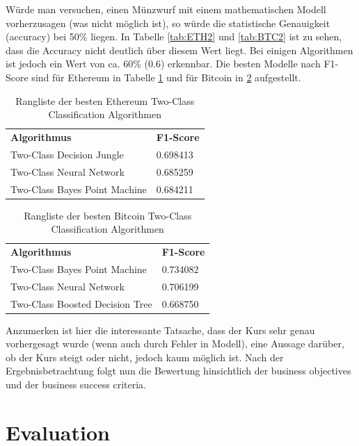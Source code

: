 Würde man versuchen, einen Münzwurf mit einem mathematischen Modell vorherzusagen (was nicht möglich ist), so würde die statistische Genauigkeit (accuracy) bei 50\% liegen. In Tabelle \ref{tab:ETH2} und \ref{tab:BTC2} ist zu sehen, dass die Accuracy nicht deutlich über diesem Wert liegt. Bei einigen Algorithmen ist jedoch ein Wert von ca. 60\% (0.6) erkennbar.
Die besten Modelle nach F1-Score sind für Ethereum in Tabelle \ref{tab:ETHBest} und für Bitcoin in \ref{tab:BTCBest} aufgestellt.
\begin{table}[H]
\centering
\begin{tabular}{|p{4cm}|p{4cm}|}
\hline
\textbf{Algorithmus} & \textbf{F1-Score}\\ 
\hhline{==}
Two-Class Decision Jungle & 0.698413 \\ \hline
Two-Class Neural Network & 0.685259 \\ \hline
Two-Class Bayes Point Machine & 0.684211 \\ \hline
\end{tabular}
\caption{Rangliste der besten Ethereum Two-Class Classification Algorithmen}
\label{tab:ETHBest}
\end{table}

\begin{table}[H]
\centering
\begin{tabular}{|p{4cm}|p{4cm}|}
\hline
\textbf{Algorithmus} & \textbf{F1-Score}\\ 
\hhline{==}
Two-Class Bayes Point Machine & 0.734082 \\ \hline
Two-Class Neural Network & 0.706199 \\ \hline
Two-Class Boosted Decision Tree & 0.668750 \\ \hline
\end{tabular}
\caption{Rangliste der besten Bitcoin Two-Class Classification Algorithmen}
\label{tab:BTCBest}
\end{table}
Anzumerken ist hier die interessante Tatsache, dass der Kurs sehr genau vorhergesagt wurde (wenn auch durch Fehler in Modell), eine Aussage darüber, ob der Kurs steigt oder nicht, jedoch kaum möglich ist.
Nach der Ergebnisbetrachtung folgt nun die Bewertung hinsichtlich der business objectives und der business success criteria.

\section{Evaluation}
